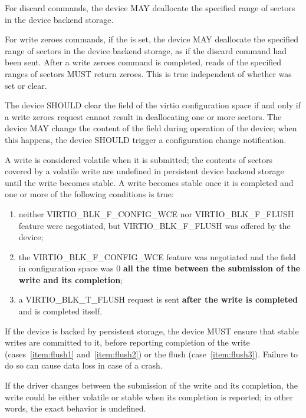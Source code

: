 For discard commands, the device MAY deallocate the specified range of
sectors in the device backend storage.

For write zeroes commands, if the  is set, the device MAY
deallocate the specified range of sectors in the device backend storage,
as if the discard command had been sent.  After a write zeroes command
is completed, reads of the specified ranges of sectors MUST return
zeroes.  This is true independent of whether  was set or clear.

The device SHOULD clear the  field of the
virtio configuration space if and only if a write zeroes request cannot
result in deallocating one or more sectors.  The device MAY change the
content of the field during operation of the device; when this happens,
the device SHOULD trigger a configuration change notification.

A write is considered volatile when it is submitted; the contents of
sectors covered by a volatile write are undefined in persistent device
backend storage until the write becomes stable.  A write becomes stable
once it is completed and one or more of the following conditions is true:

\begin{enumerate}
\item\label{item:flush1} neither VIRTIO_BLK_F_CONFIG_WCE nor
  VIRTIO_BLK_F_FLUSH feature were negotiated, but VIRTIO_BLK_F_FLUSH was
  offered by the device;

\item\label{item:flush2} the VIRTIO_BLK_F_CONFIG_WCE feature was negotiated and the
   field in configuration space was 0 \textbf{all the time between
  the submission of the write and its completion};

\item\label{item:flush3} a VIRTIO_BLK_T_FLUSH request is sent \textbf{after the write is
  completed} and is completed itself.
\end{enumerate}

If the device is backed by persistent storage, the device MUST ensure that
stable writes are committed to it, before reporting completion of the write
(cases~\ref{item:flush1} and~\ref{item:flush2}) or the flush
(case~\ref{item:flush3}).  Failure to do so can cause data loss
in case of a crash.

If the driver changes  between the submission of the write
and its completion, the write could be either volatile or stable when
its completion is reported; in other words, the exact behavior is undefined.

